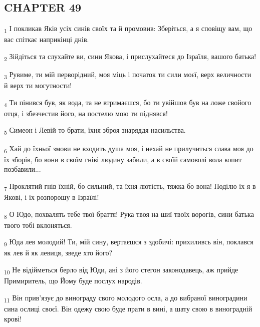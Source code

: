 \subsection{CHAPTER 49}
\begin{tcolorbox}
\textsubscript{1} І покликав Яків усіх синів своїх та й промовив: Зберіться, а я сповіщу вам, що вас спіткає наприкінці днів.
\end{tcolorbox}
\begin{tcolorbox}
\textsubscript{2} Зійдіться та слухайте ви, сини Якова, і прислухайтеся до Ізраїля, вашого батька!
\end{tcolorbox}
\begin{tcolorbox}
\textsubscript{3} Рувиме, ти мій перворідний, моя міць і початок ти сили моєї, верх величности й верх ти могутности!
\end{tcolorbox}
\begin{tcolorbox}
\textsubscript{4} Ти пінився був, як вода, та не втримаєшся, бо ти увійшов був на ложе свойого отця, і збезчестив його, на постелю мою ти піднявся!
\end{tcolorbox}
\begin{tcolorbox}
\textsubscript{5} Симеон і Левій то брати, їхня зброя знаряддя насильства.
\end{tcolorbox}
\begin{tcolorbox}
\textsubscript{6} Хай до їхньої змови не входить душа моя, і нехай не прилучиться слава моя до їх зборів, бо вони в своїм гніві людину забили, а в своїй самоволі вола копит позбавили...
\end{tcolorbox}
\begin{tcolorbox}
\textsubscript{7} Проклятий гнів їхній, бо сильний, та їхня лютість, тяжка бо вона! Поділю їх я в Якові, і їх розпорошу в Ізраїлі!
\end{tcolorbox}
\begin{tcolorbox}
\textsubscript{8} О Юдо, похвалять тебе твої браття! Рука твоя на шиї твоїх ворогів, сини батька твого тобі вклоняться.
\end{tcolorbox}
\begin{tcolorbox}
\textsubscript{9} Юда лев молодий! Ти, мій сину, вертаєшся з здобичі: прихиливсь він, поклався як лев й як левиця, зведе хто його?
\end{tcolorbox}
\begin{tcolorbox}
\textsubscript{10} Не відійметься берло від Юди, ані з його стегон законодавець, аж прийде Примиритель, що Йому буде послух народів.
\end{tcolorbox}
\begin{tcolorbox}
\textsubscript{11} Він прив'язує до винограду свого молодого осла, а до вибраної виноградини сина ослиці своєї. Він одежу свою буде прати в вині, а шату свою в виноградній крові!
\end{tcolorbox}
